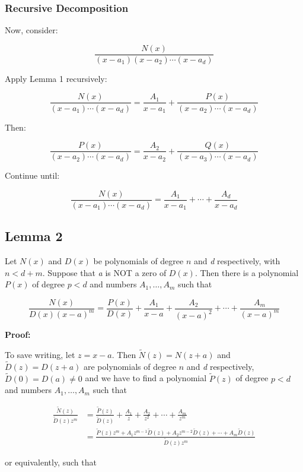 \subsubsection{Recursive Decomposition}

Now, consider:

\[
    \frac{N(x)}{(x - a_1)(x - a_2)\cdots(x - a_d)}
\]

Apply Lemma 1 recursively:

\[
    \frac{N(x)}{(x - a_1)\cdots(x - a_d)} = \frac{A_1}{x - a_1} + \frac{P(x)}{(x - a_2)\cdots(x - a_d)}
\]

Then:

\[
    \frac{P(x)}{(x - a_2)\cdots(x - a_d)} = \frac{A_2}{x - a_2} + \frac{Q(x)}{(x - a_3)\cdots(x - a_d)}
\]

Continue until:

\[
    \frac{N(x)}{(x - a_1)\cdots(x - a_d)} = \frac{A_1}{x - a_1} + \cdots + \frac{A_d}{x - a_d}
\]

\subsection{Lemma 2}

Let \(N(x)\) and \(D(x)\) be polynomials of degree \(n\) and \emph{d} respectively, with \(n < d + m\).
Suppose that \emph{a} is NOT a zero of \(D(x)\). Then there is a polynomial \(P(x)\) of degree \(p < d\) and
numbers \(A_1, \dots, A_m\) such that

\[
    \frac{N(x)}{D(x) {(x-a)}^m} = \frac{P(x)}{D(x)} + \frac{A_1}{x-a} + \frac{A_2}{{(x-a)}^2} + \cdots + 
    \frac{A_m}{{(x-a)}^m}
\]

\textbf{Proof:} 

To save writing, let \(z = x - a\). Then \(\tilde{N}(z) = N(z + a)\) and \(\tilde{D}(z) = D(z + a)\)
are polynomials of degree \(n\) and \emph{d} respectively, \(\tilde{D}(0) = D(a) \neq 0\) and we have to find a
polynomial \(\tilde{P}(z)\) of degree \(p < d\) and numbers \(A_1, \dots, A_m\) such that

\begin{align*}
    \frac{\tilde{N}(z)}{\tilde{D}(z) z^m} &= \frac{\tilde{P}(z)}{\tilde{D}(z)} + \frac{A_1}{z} + \frac{A_2}{z^2} + \cdots + \frac{A_m}{z^m} \\
    &= \frac{\tilde{P}(z) z^m + A_1 z^{m-1} \tilde{D}(z) + A_2 z^{m-2} \tilde{D}(z) + \cdots + A_m \tilde{D}(z)}{\tilde{D}(z) z^m}
\end{align*}

or equivalently, such that

